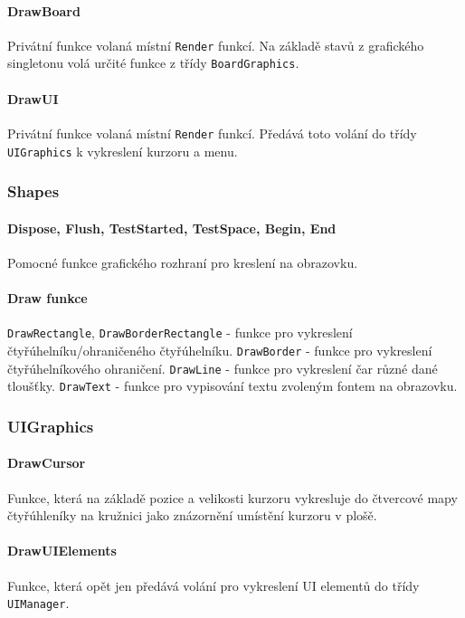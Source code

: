 \documentclass[a4paper, 12pt]{article}
\begin{document}
\paragraph{DrawBoard}
Privátní funkce volaná místní \texttt{Render} funkcí. Na základě stavů z
grafického singletonu volá určité funkce z třídy \texttt{BoardGraphics}.

\paragraph{DrawUI}
Privátní funkce volaná místní \texttt{Render} funkcí. Předává toto volání do
třídy \texttt{UIGraphics} k vykreslení kurzoru a menu.

\subsubsection{Shapes}

\paragraph{Dispose, Flush, TestStarted, TestSpace, Begin, End}
Pomocné funkce grafického rozhraní pro kreslení na obrazovku.

\paragraph{Draw funkce}
\texttt{DrawRectangle}, \texttt{DrawBorderRectangle} - funkce pro vykreslení
čtyřúhelníku/ohraničeného čtyřúhelníku.
\texttt{DrawBorder} - funkce pro vykreslení čtyřúhelníkového ohraničení.
\texttt{DrawLine} - funkce pro vykreslení čar různé dané tloušťky.
\texttt{DrawText} - funkce pro vypisování textu zvoleným fontem na obrazovku.

\subsubsection{UIGraphics}
\paragraph{DrawCursor}
Funkce, která na základě pozice a velikosti kurzoru vykresluje do čtvercové
mapy čtyřúhleníky na kružnici jako znázornění umístění kurzoru v plošě.

\paragraph{DrawUIElements}
Funkce, která opět jen předává volání pro vykreslení UI elementů do třídy
\texttt{UIManager}.
\end{document}
